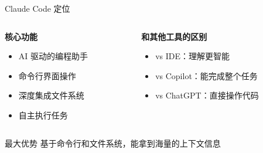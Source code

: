 \documentclass[aspectratio=169,xcolor=dvipsnames]{beamer}
\begin{document}
\begin{frame}{Claude Code 定位}
  \begin{columns}
    \begin{column}{0.48\textwidth}
      \textbf{核心功能}
      \begin{itemize}
        \item AI 驱动的编程助手
        \item 命令行界面操作
        \item 深度集成文件系统
        \item 自主执行任务
      \end{itemize}
    \end{column}
    \begin{column}{0.48\textwidth}
      \textbf{和其他工具的区别}
      \begin{itemize}
        \item vs IDE：理解更智能
        \item vs Copilot：能完成整个任务
        \item vs ChatGPT：直接操作代码
      \end{itemize}
    \end{column}
  \end{columns}

  \vspace{0.5cm}

  \begin{block}{最大优势}
    基于命令行和文件系统，能拿到海量的上下文信息
  \end{block}
\end{frame}
\end{document}
